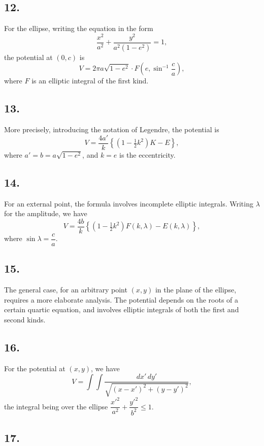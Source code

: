 \documentclass[11pt,a4paper]{book}
\begin{document}
\subsection*{12.}

For the ellipse, writing the equation in the form
\[
\frac{x^2}{a^2} + \frac{y^2}{a^2(1-e^2)} = 1,
\]
the potential at $(0,c)$ is
\[
V = 2\pi a\sqrt{1-e^2}\cdot F\left(e, \sin^{-1}\frac{c}{a}\right),
\]
where $F$ is an elliptic integral of the first kind.

\newpage
\subsection*{13.}

More precisely, introducing the notation of Legendre, the potential is
\[
V = \frac{4a'}{k}\left\{(1-\tfrac{1}{2}k^2)K - E\right\},
\]
where $a'=b=a\sqrt{1-e^2}$, and $k=e$ is the eccentricity.

\subsection*{14.}

For an external point, the formula involves incomplete elliptic integrals.
Writing $\lambda$ for the amplitude, we have
\[
V = \frac{4b}{k}\left\{
      (1-\tfrac{1}{2}k^2)F(k,\lambda) - E(k,\lambda)
    \right\},
\]
where $\sin\lambda = \dfrac{c}{a}$.

\subsection*{15.}

The general case, for an arbitrary point $(x,y)$ in the plane of the
ellipse, requires a more elaborate analysis. The potential depends on the
roots of a certain quartic equation, and involves elliptic integrals of both
the first and second kinds.

\subsection*{16.}

For the potential at $(x,y)$, we have
\[
V = \int\!\!\!\int \frac{dx'\,dy'}{\sqrt{(x-x')^2+(y-y')^2}},
\]
the integral being over the ellipse $\dfrac{x'^2}{a^2}+\dfrac{y'^2}{b^2}\leq 1$.

\newpage
\subsection*{17.}
\end{document}

